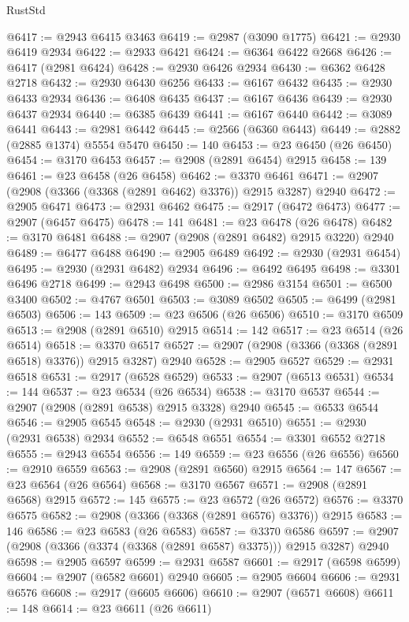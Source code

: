 \begin{lexlean}{RustStd}
\begin{coremodule}
@6417 := @2943 @6415 @3463
@6419 := @2987 (@3090 @1775)
@6421 := @2930 @6419 @2934
@6422 := @2933 @6421
@6424 := @6364 @6422 @2668
@6426 := @6417 (@2981 @6424)
@6428 := @2930 @6426 @2934
@6430 := @6362 @6428 @2718
@6432 := @2930 @6430 @6256
@6433 := @6167 @6432
@6435 := @2930 @6433 @2934
@6436 := @6408 @6435
@6437 := @6167 @6436
@6439 := @2930 @6437 @2934
@6440 := @6385 @6439
@6441 := @6167 @6440
@6442 := @3089 @6441
@6443 := @2981 @6442
@6445 := @2566 (@6360 @6443)
@6449 := @2882 (@2885 @1374) @5554 @5470
@6450 := 140
@6453 := @23 @6450 (@26 @6450)
@6454 := @3170 @6453
@6457 := @2908 (@2891 @6454) @2915
@6458 := 139
@6461 := @23 @6458 (@26 @6458)
@6462 := @3370 @6461
@6471 := @2907 (@2908 (@3366 (@3368 (@2891 @6462) @3376)) @2915 @3287) @2940
@6472 := @2905 @6471
@6473 := @2931 @6462
@6475 := @2917 (@6472 @6473)
@6477 := @2907 (@6457 @6475)
@6478 := 141
@6481 := @23 @6478 (@26 @6478)
@6482 := @3170 @6481
@6488 := @2907 (@2908 (@2891 @6482) @2915 @3220) @2940
@6489 := @6477 @6488
@6490 := @2905 @6489
@6492 := @2930 (@2931 @6454)
@6495 := @2930 (@2931 @6482) @2934
@6496 := @6492 @6495
@6498 := @3301 @6496 @2718
@6499 := @2943 @6498
@6500 := @2986 @3154
@6501 := @6500 @3400
@6502 := @4767 @6501
@6503 := @3089 @6502
@6505 := @6499 (@2981 @6503)
@6506 := 143
@6509 := @23 @6506 (@26 @6506)
@6510 := @3170 @6509
@6513 := @2908 (@2891 @6510) @2915
@6514 := 142
@6517 := @23 @6514 (@26 @6514)
@6518 := @3370 @6517
@6527 := @2907 (@2908 (@3366 (@3368 (@2891 @6518) @3376)) @2915 @3287) @2940
@6528 := @2905 @6527
@6529 := @2931 @6518
@6531 := @2917 (@6528 @6529)
@6533 := @2907 (@6513 @6531)
@6534 := 144
@6537 := @23 @6534 (@26 @6534)
@6538 := @3170 @6537
@6544 := @2907 (@2908 (@2891 @6538) @2915 @3328) @2940
@6545 := @6533 @6544
@6546 := @2905 @6545
@6548 := @2930 (@2931 @6510)
@6551 := @2930 (@2931 @6538) @2934
@6552 := @6548 @6551
@6554 := @3301 @6552 @2718
@6555 := @2943 @6554
@6556 := 149
@6559 := @23 @6556 (@26 @6556)
@6560 := @2910 @6559
@6563 := @2908 (@2891 @6560) @2915
@6564 := 147
@6567 := @23 @6564 (@26 @6564)
@6568 := @3170 @6567
@6571 := @2908 (@2891 @6568) @2915
@6572 := 145
@6575 := @23 @6572 (@26 @6572)
@6576 := @3370 @6575
@6582 := @2908 (@3366 (@3368 (@2891 @6576) @3376)) @2915
@6583 := 146
@6586 := @23 @6583 (@26 @6583)
@6587 := @3370 @6586
@6597 := @2907 (@2908 (@3366 (@3374 (@3368 (@2891 @6587) @3375))) @2915 @3287) @2940
@6598 := @2905 @6597
@6599 := @2931 @6587
@6601 := @2917 (@6598 @6599)
@6604 := @2907 (@6582 @6601) @2940
@6605 := @2905 @6604
@6606 := @2931 @6576
@6608 := @2917 (@6605 @6606)
@6610 := @2907 (@6571 @6608)
@6611 := 148
@6614 := @23 @6611 (@26 @6611)

\end{coremodule}
\end{lexlean}
